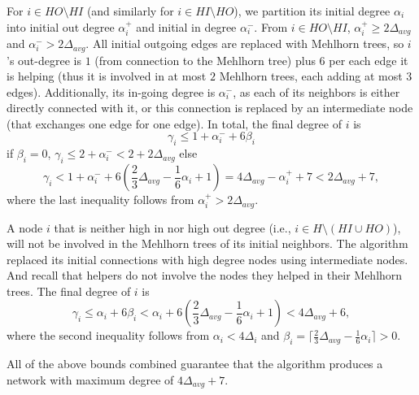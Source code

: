 \documentclass{article}
\begin{document}
For $i \in HO \setminus HI$ (and similarly for $i \in HI \setminus HO$),
we partition its initial degree $\alpha_i$ into initial out degree $\alpha_i^+$ and
initial in degree $\alpha_i^-$. 
From $i \in HO \setminus HI$, $\alpha_i^+ \geq 2\Delta_{avg}$ and $\alpha_i^- > 2\Delta_{avg}$.
All initial outgoing edges are replaced with Mehlhorn trees, so $i$'s out-degree is $1$ (from connection to the Mehlhorn tree) plus $6$ per each edge it is helping (thus it is involved in at most $2$ Mehlhorn trees, each adding at most $3$ edges).
Additionally, its in-going degree is $\alpha_i^-$, as each of its neighbors is either directly connected with it, or this connection is replaced by an intermediate node (that exchanges one edge for one edge).
In total, the final degree of $i$ is
$$\gamma_i \leq 1 + \alpha_i^- + 6\beta_i$$
if $\beta_i = 0$, $\gamma_i \leq 2 + \alpha_i^- < 2 + 2\Delta_{avg}$
else
$$\gamma_i < 1 + \alpha_i^- + 6(\frac{2}{3}\Delta_{avg} - \frac{1}{6}\alpha_i + 1) =  4\Delta_{avg} - \alpha_i^+ + 7 < 2\Delta_{avg}+7,$$
where the last inequality follows from $\alpha_i^+ > 2\Delta_{avg}$.

A node $i$ that is neither high in nor high out degree (i.e., $i \in H \setminus (HI \cup HO)$),
will not be involved in the Mehlhorn trees of its initial neighbors. The algorithm
replaced its initial connections with high degree nodes using 
intermediate nodes. And recall that helpers do not involve
the nodes they helped in their Mehlhorn trees.
The final degree of $i$ is
$$\gamma_i \leq \alpha_i + 6\beta_i < \alpha_i + 6(\frac{2}{3}\Delta_{avg}-\frac{1}{6}\alpha_i + 1) < 4\Delta_{avg} + 6,$$
where the second inequality follows from
$\alpha_i < 4\Delta_i$ and $\beta_i = \lceil\frac{2}{3}\Delta_{avg}-\frac{1}{6}\alpha_i\rceil > 0$.

All of the above bounds combined guarantee that the algorithm produces a network
with maximum degree of $4\Delta_{avg} + 7$.
\end{document}
